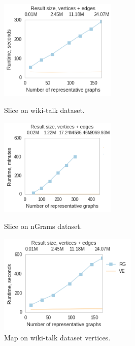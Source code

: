 \begin{figure}
\centering
\begin{minipage}{2.2in}
\centering
\includegraphics[width=2.2in]{figs/slice_wikitalk_build13.png}
\vspace{-0.1in}
\caption{Slice on wiki-talk dataset.}
\label{fig:slicewiki}
\vspace{-0.1in}
\end{minipage}
\begin{minipage}{2.2in}
\centering
\includegraphics[width=2.2in]{figs/slice_ngrams_build13.png}
\vspace{-0.1in}
\caption{Slice on nGrams dataset.}
\label{fig:slicengrams}
\vspace{-0.1in}
\end{minipage}
\begin{minipage}{2.2in}
\centering
\includegraphics[width=2.6in]{figs/project_wikitalk_build13.png}
\vspace{-0.1in}
\caption{Map on wiki-talk dataset vertices.}
\label{fig:project}
\vspace{-0.1in}
\end{minipage}
\end{figure}

